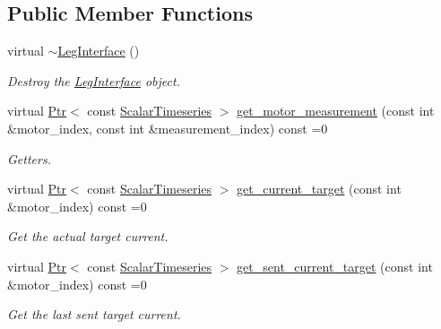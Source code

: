 \subsection*{Public Member Functions}
\begin{DoxyCompactItemize}
\item 
virtual \hyperlink{classblmc__drivers_1_1LegInterface_afe46102b0ce1c790e921d71f86868066}{$\sim$\+Leg\+Interface} ()\hypertarget{classblmc__drivers_1_1LegInterface_afe46102b0ce1c790e921d71f86868066}{}\label{classblmc__drivers_1_1LegInterface_afe46102b0ce1c790e921d71f86868066}

\begin{DoxyCompactList}\small\item\em Destroy the \hyperlink{classblmc__drivers_1_1LegInterface}{Leg\+Interface} object. \end{DoxyCompactList}\item 
virtual \hyperlink{classblmc__drivers_1_1LegInterface_ac5af9e6514abff5ee918813925a8e42d}{Ptr}$<$ const \hyperlink{classblmc__drivers_1_1LegInterface_a57a35b64a76fb4225637828d1b1c35a6}{Scalar\+Timeseries} $>$ \hyperlink{classblmc__drivers_1_1LegInterface_ae653c7ee0ab7aa9d16a6bfce01580200}{get\+\_\+motor\+\_\+measurement} (const int \&motor\+\_\+index, const int \&measurement\+\_\+index) const =0
\begin{DoxyCompactList}\small\item\em Getters. \end{DoxyCompactList}\item 
virtual \hyperlink{classblmc__drivers_1_1LegInterface_ac5af9e6514abff5ee918813925a8e42d}{Ptr}$<$ const \hyperlink{classblmc__drivers_1_1LegInterface_a57a35b64a76fb4225637828d1b1c35a6}{Scalar\+Timeseries} $>$ \hyperlink{classblmc__drivers_1_1LegInterface_a44bac5c9a6015f0e08370b3bc9957512}{get\+\_\+current\+\_\+target} (const int \&motor\+\_\+index) const =0
\begin{DoxyCompactList}\small\item\em Get the actual target current. \end{DoxyCompactList}\item 
virtual \hyperlink{classblmc__drivers_1_1LegInterface_ac5af9e6514abff5ee918813925a8e42d}{Ptr}$<$ const \hyperlink{classblmc__drivers_1_1LegInterface_a57a35b64a76fb4225637828d1b1c35a6}{Scalar\+Timeseries} $>$ \hyperlink{classblmc__drivers_1_1LegInterface_ab724283c8eeadca0e7b8829de64f4f44}{get\+\_\+sent\+\_\+current\+\_\+target} (const int \&motor\+\_\+index) const =0
\begin{DoxyCompactList}\small\item\em Get the last sent target current. \end{DoxyCompactList}\item 

\end{DoxyCompactItemize}
